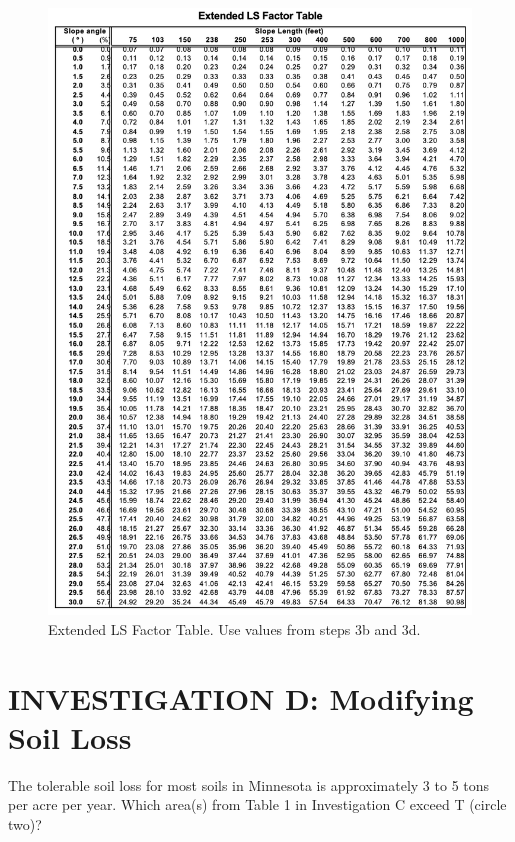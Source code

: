 \documentclass[
  letterpaper,
  twocolumn,
  portrait]{scrbook}
\begin{document}
\begin{figure}

{\centering \includegraphics{extended-ls-factor-table.png}

}

\caption{\label{fig-ls}Extended LS Factor Table. Use values from steps
3b and 3d.}

\end{figure}

\hypertarget{investigation-d-modifying-soil-loss}{%
\section{INVESTIGATION D: Modifying Soil
Loss}\label{investigation-d-modifying-soil-loss}}

The tolerable soil loss for most soils in Minnesota is approximately 3
to 5 tons per acre per year. Which area(s) from Table 1 in Investigation
C exceed T (circle two)?
\end{document}
